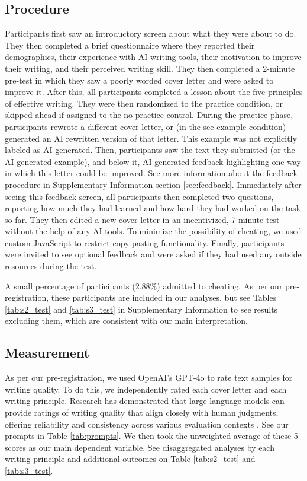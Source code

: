 \documentclass[11pt]{report}
\begin{document}
\begin{mainf}
\subsection*{Procedure}
Participants first saw an introductory screen about what they were about to do. 
  They then completed a brief questionnaire where they reported their demographics, their experience with AI writing tools, their motivation to improve their writing, and their perceived writing skill. 
  They then completed a 2-minute pre-test in which they saw a poorly worded cover letter and were asked to improve it. 
  After this, all participants completed a lesson about the five principles of effective writing. 
  They were then randomized to the practice condition, or skipped ahead if assigned to the no-practice control. 
  During the practice phase, participants rewrote a different cover letter, or (in the see example condition) generated an AI rewritten version of that letter. 
  This example was not explicitly labeled as AI-generated.
  Then, participants saw the text they submitted (or the AI-generated example), and below it, AI-generated feedback highlighting one way in which this letter could be improved. See more information about the feedback procedure in Supplementary Information section \ref{sec:feedback}.
  Immediately after seeing this feedback screen, all participants then completed two questions, reporting how much they had learned and how hard they had worked on the task so far. 
  They then edited a new cover letter in an incentivized, 7-minute test without the help of any AI tools. 
  To minimize the possibility of cheating, we used custom JavaScript to restrict copy-pasting functionality. 
  Finally, participants were invited to see optional feedback and were asked if they had used any outside resources during the test. 
  
A small percentage of participants (2.88\%) admitted to cheating. 
  As per our pre-registration, these participants are included in our analyses, but see Tables \ref{tab:s2_test} and \ref{tab:s3_test} in Supplementary Information to see results excluding them, which are consistent with our main interpretation.

\subsection*{Measurement}
As per our pre-registration, we used OpenAI's GPT-4o to rate text samples for writing quality. 
    To do this, we independently rated each cover letter and each writing principle. 
    Research has demonstrated that large language models can provide ratings of writing quality that align closely with human judgments, offering reliability and consistency across various evaluation contexts \cite{rathje2024, hackl2023}.
    See our prompts in Table \ref{tab:prompts}. 
    We then took the unweighted average of these 5 scores as our main dependent variable. 
    See disaggregated analyses by each writing principle and additional outcomes on Table \ref{tab:s2_test} and \ref{tab:s3_test}.


\end{mainf}
\end{document}
